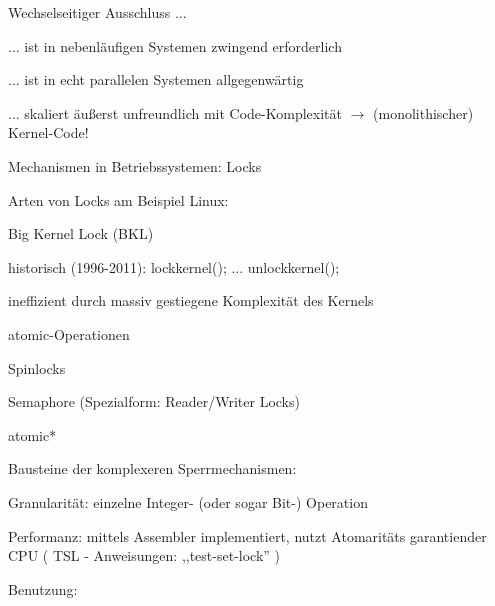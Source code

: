 \documentclass[a4paper]{article}
\begin{document}
\begin{multicols}{3}
    \begin{itemize*}
        \item
        Wechselseitiger Ausschluss ...
        \begin{itemize*}
            \item ... ist in nebenläufigen Systemen zwingend erforderlich
            \item ... ist in echt parallelen Systemen allgegenwärtig
            \item ... skaliert äußerst unfreundlich mit Code-Komplexität $\rightarrow$ (monolithischer) Kernel-Code!
        \end{itemize*}
        \item
        Mechanismen in Betriebssystemen: Locks
        \item
        Arten von Locks am Beispiel Linux:
        \begin{itemize*}
            \item Big Kernel Lock (BKL) \begin{itemize*} \item historisch (1996-2011): lockkernel(); ... unlockkernel(); \item ineffizient durch massiv gestiegene Komplexität des Kernels \end{itemize*}
            \item atomic-Operationen
            \item Spinlocks
            \item Semaphore (Spezialform: Reader/Writer Locks)
        \end{itemize*}
    \end{itemize*}

    atomic*

    \begin{itemize*}
        \item
        Bausteine der komplexeren Sperrmechanismen:
        \begin{itemize*}
            \item Granularität: einzelne Integer- (oder sogar Bit-) Operation
            \item Performanz: mittels Assembler implementiert, nutzt Atomaritäts garantiender CPU ( TSL - Anweisungen: ,,test-set-lock'' )
        \end{itemize*}
        \item
        Benutzung:


\end{itemize*}
\end{multicols}
\end{document}
